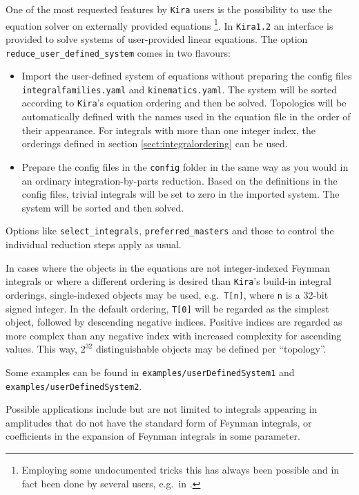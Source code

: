\documentclass[a4paper,12pt]{article}
\newcommand*{\kira}{\texttt{Kira}}
\begin{document}
One of the most requested features by \kira{} users is the possibility to use
the equation solver on externally provided equations%
\footnote{Employing some undocumented tricks this has always been possible and
in fact been done by several users, e.g.\ in \cite{Harlander:2018zpi}.}.
In \kira{}\;\texttt{1.2} an interface is provided to solve systems of
user-provided linear equations.
The option \texttt{reduce\_user\_defined\_system} comes in two flavours:
\begin{itemize}
  \item Import the user-defined system of equations without preparing the config
    files \texttt{integralfamilies.yaml} and \texttt{kinematics.yaml}.
    The system will be sorted according to \kira{}'s equation ordering and then
    be solved.
    Topologies will be automatically defined with the names used in the equation
    file in the order of their appearance.
    For integrals with more than one integer index, the orderings defined in
    section \ref{sect:integralordering} can be used.
  \item Prepare the config files in the \texttt{config} folder in the same way
    as you would in an ordinary integration-by-parts reduction.
    Based on the definitions in the config files, trivial integrals will be set
    to zero in the imported system.
    The system will be sorted and then solved.
\end{itemize}
Options like \texttt{select\_integrals}, \texttt{preferred\_masters} and those
to control the individual reduction steps apply as usual.

In cases where the objects in the equations are not integer-indexed Feynman
integrals or where a different ordering is desired than \kira{}'s build-in
integral orderings, single-indexed objects may be used, e.g.\ \texttt{T[n]},
where \texttt{n} is a 32-bit signed integer. In the default ordering,
\texttt{T[0]} will be regarded as the simplest object, followed by descending
negative indices. Positive indices are regarded as more complex than any
negative index with increased complexity for ascending values. This way,
$2^{32}$ distinguishable objects may be defined per ``topology''.

Some examples can be found in \texttt{examples/userDefinedSystem1} and
\texttt{examples/userDefinedSystem2}.

Possible applications include but are not limited to integrals appearing in
amplitudes that do not have the standard form of Feynman integrals, or
coefficients in the expansion of Feynman integrals in some parameter.
\end{document}
